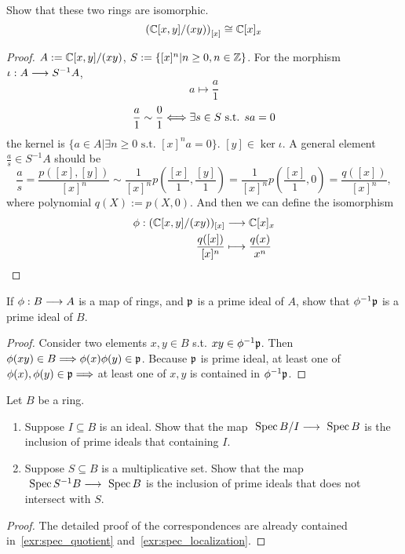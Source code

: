 \begin{exr}\label{chap3exr:3.2.L}
Show that these two rings are isomorphic. 
$$
\left(\mathbb C[x,y]/(xy)\right)_{[x]}\cong \mathbb C[x]_x
$$
\end{exr}
\begin{proof}
$A:=\mathbb C[x,y]/(xy)$, $S:=\{[x]^n|n\geq 0,n\in\mathbb Z\}$. For the morphism $\iota:A\longrightarrow S^{-1}A$,
$$
a\longmapsto \frac{a}{1}
$$
$$
\frac{a}{1}\sim \frac{0}{1}\Longleftrightarrow \exists s\in S \text{ s.t. } sa=0
$$
 the kernel is $\{a\in A|\exists n\geq 0 \text{ s.t. } [x]^na=0\}$. $[y]\in \ker \iota$. A general element $\frac{a}{s}\in S^{-1}A$ should be 
 $$
\frac{a}{s}=\frac{p([x],[y])}{[x]^n}\sim \frac{1}{[x]^n}p\left(\frac{[x]}{1},\frac{[y]}{1}\right)=\frac{1}{[x]^n}p\left(\frac{[x]}{1},0\right)=\frac{q([x])}{[x]^n},
 $$
 where polynomial $q(X):=p(X,0)$.
And then we can define the isomorphism 
$$
\begin{aligned}
\phi: (\mathbb C[x,y]/(xy))_{[x]}&\longrightarrow \mathbb C[x]_x\\
 \frac{q([x])}{[x]^n}&\longmapsto \frac{q(x)}{x^n}
\end{aligned}
$$
\end{proof}

\begin{exr}
If $\phi: B\longrightarrow A$ is a map of rings, and ${\mathfrak p}$ is a prime ideal of $A$, show that $\phi^{-1}{\mathfrak p}$ is a prime ideal of $B$.
\end{exr}
\begin{proof}
Consider two elements $x,y\in B$ s.t. $xy\in \phi^{-1}{\mathfrak p}$. Then $\phi(xy)\in B\Longrightarrow \phi(x)\phi(y)\in{\mathfrak p}$. Because ${\mathfrak p}$ is prime ideal, at least one of $\phi(x),\phi(y)\in{\mathfrak p}\Longrightarrow $ at least one of $x,y$ is contained in $\phi^{-1}{\mathfrak p}$.
\end{proof}

\begin{exr}
Let $B$ be a ring.
\begin{enumerate}[label=(\alph*)]
	\item  Suppose $I\subseteq B$ is an ideal. Show that the map $\text{ Spec\,} B/I\longrightarrow \text{ Spec\,} B$ is the inclusion of  prime ideals that containing $I$.
    \item  Suppose $S\subseteq B$ is a multiplicative set. Show that the map $\text{ Spec\,} S^{-1}B\longrightarrow \text{ Spec\,} B$ is the inclusion of prime ideals that does not intersect with $S$.
\end{enumerate}
\end{exr}
\begin{proof}
The detailed proof of the correspondences are already contained in~\ref{exr:spec_quotient} and~\ref{exr:spec_localization}.
\end{proof}

